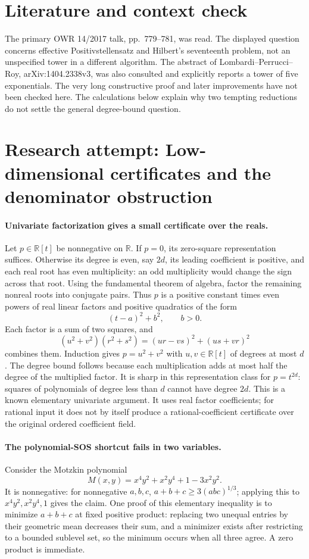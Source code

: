 \documentclass[11pt]{article}
\begin{document}
\section{Literature and context check}
The primary OWR 14/2017 talk, pp.~779--781, was read. The displayed question concerns effective Positivstellensatz and Hilbert's seventeenth problem, not an unspecified tower in a different algorithm. The abstract of Lombardi--Perrucci--Roy, arXiv:1404.2338v3, was also consulted and explicitly reports a tower of five exponentials. The very long constructive proof and later improvements have not been checked here. The calculations below explain why two tempting reductions do not settle the general degree-bound question.
\section{Research attempt: Low-dimensional certificates and the denominator obstruction}

\paragraph{Univariate factorization gives a small certificate over the reals.}
Let $p\in\mathbb R[t]$ be nonnegative on $\mathbb R$. If $p=0$, its zero-square representation suffices. Otherwise its degree is even, say $2d$, its leading coefficient is positive, and each real root has even multiplicity: an odd multiplicity would change the sign across that root. Using the fundamental theorem of algebra, factor the remaining nonreal roots into conjugate pairs. Thus $p$ is a positive constant times even powers of real linear factors and positive quadratics of the form
\[
 (t-a)^2+b^2,\qquad b>0.
\]
Each factor is a sum of two squares, and
\[
 (u^2+v^2)(r^2+s^2)=(ur-vs)^2+(us+vr)^2
\]
combines them. Induction gives $p=u^2+v^2$ with $u,v\in\mathbb R[t]$ of degrees at most $d$. The degree bound follows because each multiplication adds at most half the degree of the multiplied factor. It is sharp in this representation class for $p=t^{2d}$: squares of polynomials of degree less than $d$ cannot have degree $2d$. This is a known elementary univariate argument. It uses real factor coefficients; for rational input it does not by itself produce a rational-coefficient certificate over the original ordered coefficient field.

\paragraph{The polynomial-SOS shortcut fails in two variables.}
Consider the Motzkin polynomial
\[
 M(x,y)=x^4y^2+x^2y^4+1-3x^2y^2.
\]
It is nonnegative: for nonnegative $a,b,c$, $a+b+c\ge3(abc)^{1/3}$; applying this to $x^4y^2,x^2y^4,1$ gives the claim. One proof of this elementary inequality is to minimize $a+b+c$ at fixed positive product: replacing two unequal entries by their geometric mean decreases their sum, and a minimizer exists after restricting to a bounded sublevel set, so the minimum occurs when all three agree. A zero product is immediate.
\end{document}
